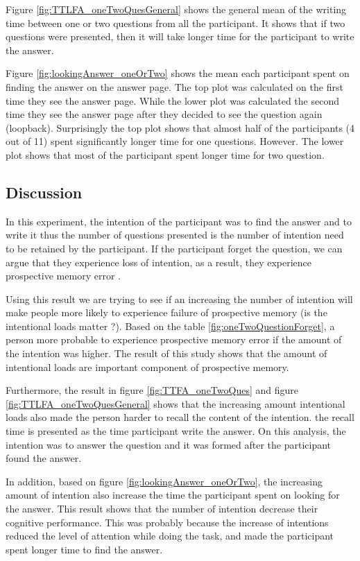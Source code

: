 Figure \ref{fig:TTLFA_oneTwoQuesGeneral} shows the general mean of the writing time between one or two questions from all the participant.
It shows that if two questions were presented, then it will take longer time for the participant to write the answer.

Figure \ref{fig:lookingAnswer_oneOrTwo} shows the mean each participant spent on finding the answer on the answer page.
 The top plot was calculated on the first time they see the answer page.
 While the lower plot was calculated the second time they see the answer page after they decided to see the question again (loopback).
Surprisingly the top plot shows that almost half of the participants (4 out of 11) spent significantly longer time for one questions.
However. The lower plot shows that most of the participant spent longer time for two question.

\subsection{Discussion}

In this experiment, the intention of the participant was to find the answer and to write it
thus the number of questions presented is the number of intention need to be retained by the participant.
If the participant forget the question, we can argue that they experience loss of intention, as a result, they experience
prospective memory error \citep{Reason1984}.

Using this result we are trying to see  if an increasing the number of intention will make people more likely to experience failure of prospective memory
(is the intentional loads matter ?).
Based on the table \ref{fig:oneTwoQuestionForget}, a person more probable to experience prospective memory error if the amount of the intention was higher.
The result of this study shows that the amount of intentional loads are important component of prospective memory.

Furthermore, the result in figure \ref{fig:TTFA_oneTwoQues} and figure \ref{fig:TTLFA_oneTwoQuesGeneral} shows that the increasing amount intentional loads also
made the person harder to recall the content of the intention. the recall time is presented as the time participant write the answer.
On this analysis, the intention was to answer the question and it was formed after the participant found the answer.

In addition, based on figure \ref{fig:lookingAnswer_oneOrTwo}, the increasing amount of intention also increase the time
the participant spent on looking for the answer. This result shows that the number of intention decrease their cognitive performance.
This was probably because the increase of intentions reduced the level of attention while doing the task, and made
the participant spent longer time to find the answer.

